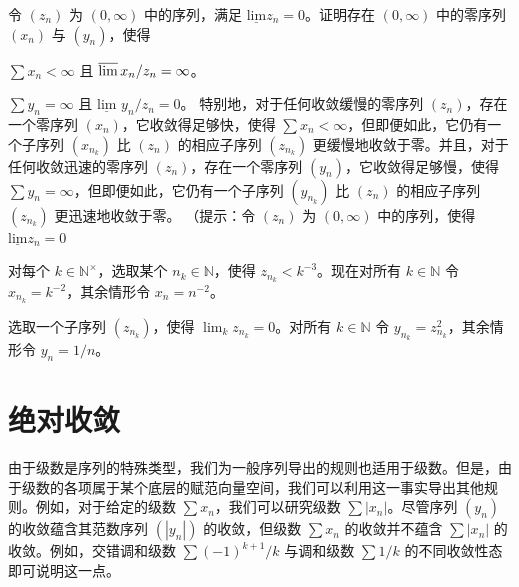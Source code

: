\begin{exercises}
\item[15.]

令 $ (z_n) $ 为 $ (0, \infty) $ 中的序列，满足 $ \underline{\text{lim}} z_n = 0 $。证明存在 $ (0, \infty) $ 中的零序列 $ (x_n) $ 与 $ (y_n) $，使得

\begin{items}
\item

$ \sum x_n < \infty $ 且 $ \varlimsup x_n / z_n = \infty $。

\item

$ \sum y_n = \infty $ 且 $ \underline{\text{lim}} $ $ y_n/z_n = 0 $。
特别地，对于任何收敛缓慢的零序列 $ (z_n) $，存在一个零序列 $ (x_n) $，它收敛得足够快，使得 $ \sum x_n < \infty $，但即便如此，它仍有一个子序列 $ (x_{n_k}) $ 比 $ (z_n) $ 的相应子序列 $ (z_{n_k}) $ 更缓慢地收敛于零。并且，对于任何收敛迅速的零序列 $ (z_n) $，存在一个零序列 $ (y_n) $，它收敛得足够慢，使得 $ \sum y_n = \infty $，但即便如此，它仍有一个子序列 $ (y_{n_k}) $ 比 $ (z_n) $ 的相应子序列 $ (z_{n_k}) $ 更迅速地收敛于零。
（提示：令 $ (z_n) $ 为 $ (0, \infty) $ 中的序列，使得 $ \underline{\text{lim}} z_n = 0 $

\end{items}

\begin{items}
\item

对每个 $ k \in \mathbb{N}^\times $，选取某个 $ n_k \in \mathbb{N} $，使得 $ z_{n_k} < k^{-3} $。现在对所有 $ k \in \mathbb{N} $ 令 $ x_{n_k} = k^{-2} $，其余情形令 $ x_n = n^{-2} $。

\item

选取一个子序列 $ (z_{n_k}) $，使得 $ \lim_{k} z_{n_k} = 0 $。对所有 $ k \in \mathbb{N} $ 令 $ y_{n_k} = z_{n_k}^2 $，其余情形令 $ y_n = 1/n $。

\end{items}

\end{exercises}

\section{绝对收敛}

由于级数是序列的特殊类型，我们为一般序列导出的规则也适用于级数。但是，由于级数的各项属于某个底层的赋范向量空间，我们可以利用这一事实导出其他规则。例如，对于给定的级数 $ \sum x_n $，我们可以研究级数 $ \sum |x_n| $。尽管序列 $(y_n)$ 的收敛蕴含其范数序列 $(|y_n|)$ 的收敛，但级数 $ \sum x_n $ 的收敛并不蕴含 $ \sum |x_n| $ 的收敛。例如，交错调和级数 $ \sum (-1)^{k+1}/k $ 与调和级数 $ \sum 1/k $ 的不同收敛性态即可说明这一点。

